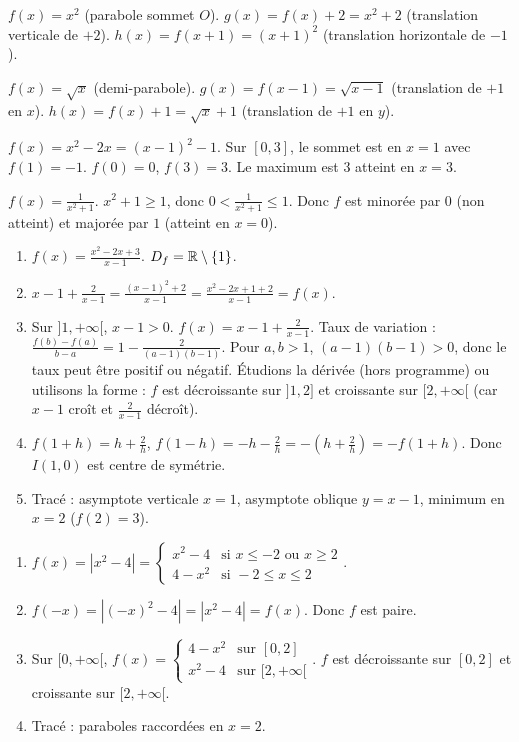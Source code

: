 $f(x)=x^2$ (parabole sommet $O$). $g(x)=f(x)+2=x^2+2$ (translation verticale de $+2$). $h(x)=f(x+1)=(x+1)^2$ (translation horizontale de $-1$).

$f(x)=\sqrt{x}$ (demi-parabole). $g(x)=f(x-1)=\sqrt{x-1}$ (translation de $+1$ en $x$). $h(x)=f(x)+1=\sqrt{x}+1$ (translation de $+1$ en $y$).

$f(x)=x^2-2x=(x-1)^2-1$. Sur $[0,3]$, le sommet est en $x=1$ avec $f(1)=-1$. $f(0)=0$, $f(3)=3$. Le maximum est $3$ atteint en $x=3$.

$f(x)=\frac{1}{x^2+1}$. $x^2+1\ge1$, donc $0<\frac{1}{x^2+1}\le1$. Donc $f$ est minorée par $0$ (non atteint) et majorée par $1$ (atteint en $x=0$).

\begin{enumerate}[label=\arabic*)]
\item $f(x)=\frac{x^2-2x+3}{x-1}$. $D_f=\mathbb{R}\setminus\{1\}$.
\item $x-1+\frac{2}{x-1}=\frac{(x-1)^2+2}{x-1}=\frac{x^2-2x+1+2}{x-1}=f(x)$.
\item Sur $]1,+\infty[$, $x-1>0$. $f(x)=x-1+\frac{2}{x-1}$. Taux de variation : $\frac{f(b)-f(a)}{b-a}=1-\frac{2}{(a-1)(b-1)}$. Pour $a,b>1$, $(a-1)(b-1)>0$, donc le taux peut être positif ou négatif. Étudions la dérivée (hors programme) ou utilisons la forme : $f$ est décroissante sur $]1,2]$ et croissante sur $[2,+\infty[$ (car $x-1$ croît et $\frac{2}{x-1}$ décroît).
\item $f(1+h)=h+\frac{2}{h}$, $f(1-h)=-h-\frac{2}{h}=-(h+\frac{2}{h})=-f(1+h)$. Donc $I(1,0)$ est centre de symétrie.
\item Tracé : asymptote verticale $x=1$, asymptote oblique $y=x-1$, minimum en $x=2$ ($f(2)=3$).
\end{enumerate}

\begin{enumerate}[label=\arabic*)]
\item $f(x)=|x^2-4|=\begin{cases} x^2-4 & \text{si } x\le-2 \text{ ou } x\ge2 \\ 4-x^2 & \text{si } -2\le x\le2 \end{cases}$.
\item $f(-x)=|(-x)^2-4|=|x^2-4|=f(x)$. Donc $f$ est paire.
\item Sur $[0,+\infty[$, $f(x)=\begin{cases} 4-x^2 & \text{sur } [0,2] \\ x^2-4 & \text{sur } [2,+\infty[ \end{cases}$. $f$ est décroissante sur $[0,2]$ et croissante sur $[2,+\infty[$.
\item Tracé : paraboles raccordées en $x=2$.
\end{enumerate}


